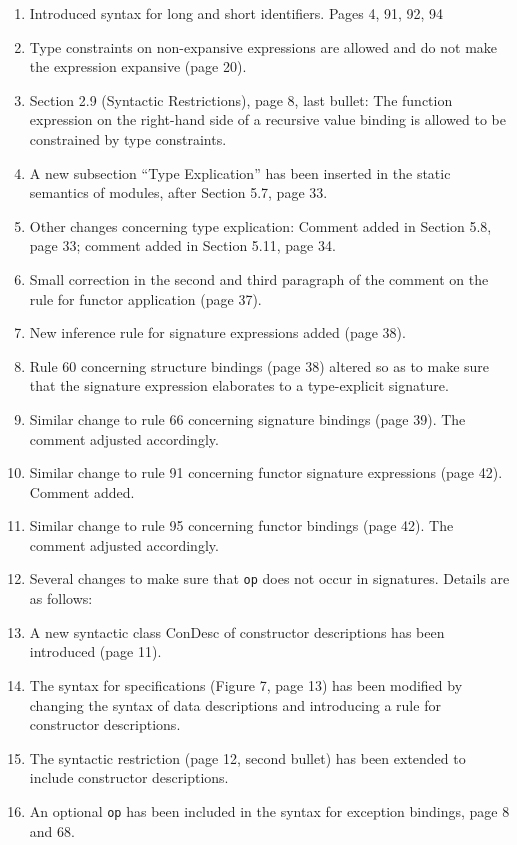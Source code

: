 \begin{description}
\begin{enumerate}
\item Introduced syntax for long and short identifiers. Pages
      4, 91, 92, 94
\item Type constraints on non-expansive expressions are allowed
      and do not make the expression expansive (page 20).
\item Section 2.9 (Syntactic Restrictions), page 8, last bullet:
      The function expression on the right-hand side of a recursive
      value binding is allowed to be constrained by type constraints.
\item A new subsection ``Type Explication'' has been inserted in the
      static semantics of modules, after Section 5.7, page 33.
\item Other changes concerning type explication: Comment added in
      Section 5.8, page 33; comment added in Section 5.11, page 34.
\item Small correction in the second and third paragraph of the comment
      on the rule for functor application (page 37).
\item New inference rule for signature expressions added (page 38).
\item Rule 60 concerning structure bindings (page 38) altered so
      as to make sure that the signature expression elaborates to
      a type-explicit signature.
\item Similar change to rule 66 concerning signature bindings (page 39).
      The comment adjusted accordingly.
\item Similar change to rule 91 concerning functor signature 
      expressions (page 42). Comment added.
\item Similar change to rule 95 concerning functor bindings (page 42).
      The comment adjusted accordingly.
\item Several changes to make sure that {\tt op} does not occur in
      signatures.  Details are as follows:
\item A new syntactic class ConDesc of constructor descriptions has
      been introduced (page 11).
\item The syntax for specifications (Figure 7, page 13) has been modified
      by changing the syntax of data descriptions and introducing a
      rule for constructor descriptions.
\item The syntactic restriction (page 12, second bullet) has been
      extended to include constructor descriptions.
\item An optional {\tt op} has been included in the syntax for
      exception bindings, page 8 and 68. 

\end{enumerate}
\end{description}
